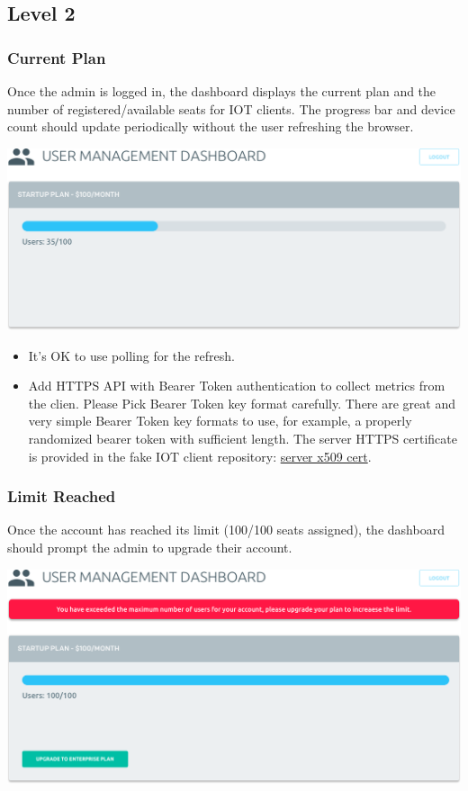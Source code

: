 \documentclass{article}
\begin{document}
  \subsection*{Level 2}

  \subsubsection{Current Plan}
  
  Once the admin is logged in, the dashboard displays the current plan and the number of registered/available seats for IOT clients. The progress bar and device count should update periodically without the user refreshing the browser.

  \begin{center}
    \includegraphics[width=\textwidth]{dashboard-initial}
  \end{center}
  
  \begin{itemize}
  \item It's OK to use polling for the refresh.
  \item Add HTTPS API with Bearer Token authentication to collect metrics from the clien.
     Please Pick Bearer Token key format carefully. There are great and very simple Bearer Token key formats to use, for example, a properly randomized bearer token with sufficient length. The server HTTPS certificate is provided in the fake IOT client repository: \href{https://github.com/gravitational/fakeiot/tree/master/fixtures}{server x509 cert}.
  \end{itemize}

  \subsubsection{Limit Reached}
   Once the account has reached its limit (100/100 seats assigned), the dashboard should prompt the admin to upgrade their account.

  \begin{center}
  \includegraphics[width=\textwidth]{dashboard-full}
  \end{center}
\end{document}
